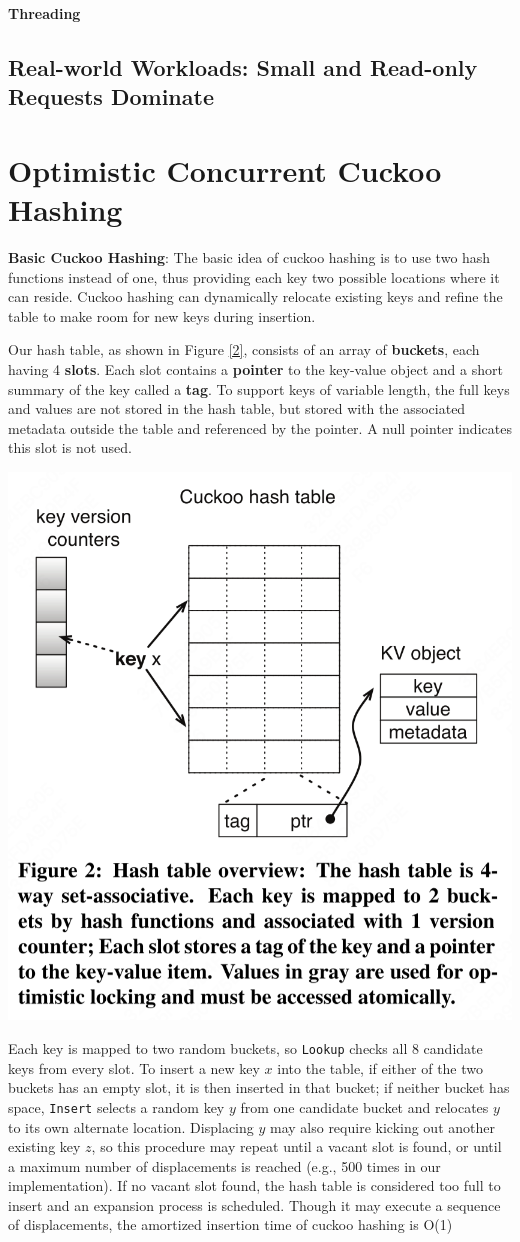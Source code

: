\documentclass[11pt]{article}
\begin{document}
\textbf{Threading}
\subsection{Real-world Workloads: Small and Read-only Requests Dominate}
\label{sec:org0bded42}
\section{Optimistic Concurrent Cuckoo Hashing}
\label{sec:orga683a29}
\textbf{Basic Cuckoo Hashing}: The basic idea of cuckoo hashing is to use two hash functions instead of one,
thus providing each key two possible locations where it can reside. Cuckoo hashing can dynamically
relocate existing keys and refine the table to make room for new keys during insertion.

Our hash table, as shown in Figure \ref{2}, consists of an array of \textbf{buckets}, each having 4 \textbf{slots}. Each
slot contains a \textbf{pointer} to the key-value object and a short summary of the key called a \textbf{tag}. To
support keys of variable length, the full keys and values are not stored in the hash table, but stored
with the associated metadata outside the table and referenced by the pointer. A null pointer indicates
this slot is not used.

\begin{center}
\includegraphics[width=.7\textwidth]{../../images/papers/175.png}
\label{2}
\end{center}

Each key is mapped to two random buckets, so \texttt{Lookup} checks all 8 candidate keys from every slot. To
insert a new key \(x\) into the table, if either of the two buckets has an empty slot, it is then
inserted in that bucket; if neither bucket has space, \texttt{Insert} selects a random key \(y\) from one
candidate bucket and relocates \(y\) to its own alternate location. Displacing \(y\) may also require
kicking out another existing key \(z\), so this procedure may repeat until a vacant slot is found, or
until a maximum number of displacements is reached (e.g., 500 times in our implementation). If no
vacant slot found, the hash table is considered too full to insert and an expansion process is
scheduled. Though it may execute a sequence of displacements, the amortized insertion time of cuckoo
hashing is O(1)
\end{document}
